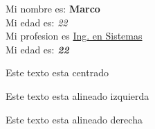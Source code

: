 \documentclass{book}
\begin{document}
Mi nombre es: \textbf{Marco} \\
Mi edad es: \textit{22} \\
Mi profesion es \underline{Ing. en Sistemas} \\
Mi edad es: \textit{\textbf{22}}
\begin{center}
Este texto esta centrado
\end {center}
\begin{flushleft}
Este texto esta alineado izquierda
\end {flushleft}
\begin{flushright}
Este texto esta alineado derecha
\end {flushright}
\end{document}
